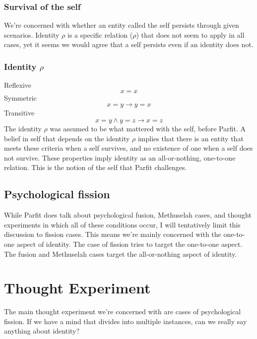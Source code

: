 \documentclass[11pt]{article}
\begin{document}
\subsubsection*{Survival of the self}
\label{sec:orge7527b4}
We're concerned with whether an entity called the self persists through given scenarios.
Identity \(\rho\) is a specific relation (\(\rho\)) that does not seem to apply in all cases,
yet it seems we would agree that a self persists even if an identity does not.

\subsubsection*{Identity \(\rho\)}
\label{sec:org4b0d125}
Reflexive \[x=x\]
Symmetric \[x=y \rightarrow y=x\]
Transitive \[x=y \wedge y=z \rightarrow x=z\]
The identity \(\rho\) was assumed to be what mattered with the self, before Parfit.
A belief in self that depends on the identity \(\rho\) implies that there is an entity that meets these criteria when a self survives, and no existence of one when a self does not survive.
These properties imply identity as an all-or-nothing, one-to-one relation.
This is the notion of the self that Parfit challenges.

\subsection{Psychological fission}
\label{sec:org091d5ab}
While Parfit does talk about psychological fusion, Methuselah cases, and thought experiments in which all of these conditions occur, I will tentatively limit this discussion to fission cases.
This means we're mainly concerned with the one-to-one aspect of identity.
The case of fission tries to target the one-to-one aspect.
The fusion and Methuselah cases target the all-or-nothing aspect of identity.

\section{Thought Experiment}
\label{sec:org3c894e2}
The main thought experiment we're concerned with are cases of psychological fission.
If we have a mind that divides into multiple instances, can we really say anything about identity?
\\\empty
\\\empty
{}
\end{document}
